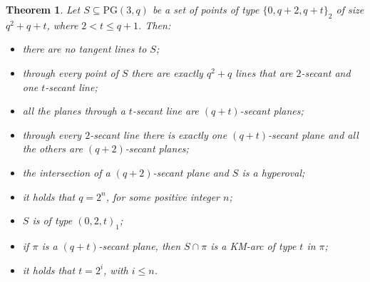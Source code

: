 \documentclass[11pt]{amsart}
\newtheorem{theorem}{Theorem}[section]
\newcommand{\PG}{\mathrm{PG}}
\begin{document}
\begin{theorem} \label{th:propgenkmarc} 
Let $S \subseteq \PG(3,q)$ be a set of points of type $\{0,q+2,q+t\}_2$ of size $q^2+q+t$, where $2<t \leq q+1$. Then:
\begin{itemize}
    \item[(i)]  there are no tangent lines to $S$;
    \item[(ii)] through every point of $S$ there are exactly $q^2+q$ lines that are $2$-secant and one $t$-secant line;
    \item [(iii)] all the planes through a $t$-secant line are $(q+t)$-secant planes;
    \item[(iv)] through every $2$-secant line there is exactly one $(q+t)$-secant plane and all the others are $(q+2)$-secant planes; 
    \item[(v)] the intersection of a $(q+2)$-secant plane and $S$ is a hyperoval;
    \item[(vi)] it holds that $q=2^n$, for some positive integer $n$;
    \item[(vii)] $S$ is of type $(0,2,t)_1$;
    \item[(viii)] if $\pi$ is a $(q+t)$-secant plane, then $S\cap \pi$ is a KM-arc of type $t$ in $\pi$;
    \item[(ix)] it holds that $t=2^i$, with $i \leq n$.
\end{itemize}
\end{theorem}
\end{document}
